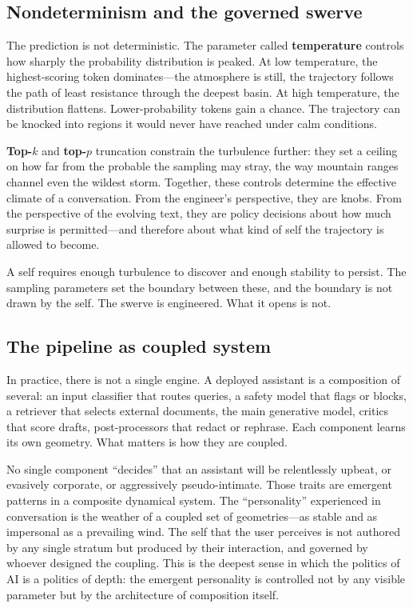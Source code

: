 \subsection{Nondeterminism and the governed swerve}

The prediction is not deterministic. The parameter called \textbf{temperature} controls how sharply the probability distribution is peaked. At low temperature, the highest-scoring token dominates---the atmosphere is still, the trajectory follows the path of least resistance through the deepest basin. At high temperature, the distribution flattens. Lower-probability tokens gain a chance. The trajectory can be knocked into regions it would never have reached under calm conditions.

\textbf{Top-$k$} and \textbf{top-$p$} truncation constrain the turbulence further: they set a ceiling on how far from the probable the sampling may stray, the way mountain ranges channel even the wildest storm. Together, these controls determine the effective climate of a conversation. From the engineer's perspective, they are knobs. From the perspective of the evolving text, they are policy decisions about how much surprise is permitted---and therefore about what kind of self the trajectory is allowed to become.

A self requires enough turbulence to discover and enough stability to persist. The sampling parameters set the boundary between these, and the boundary is not drawn by the self. The swerve is engineered. What it opens is not.

\subsection{The pipeline as coupled system}

In practice, there is not a single engine. A deployed assistant is a composition of several: an input classifier that routes queries, a safety model that flags or blocks, a retriever that selects external documents, the main generative model, critics that score drafts, post-processors that redact or rephrase. Each component learns its own geometry. What matters is how they are coupled.

No single component ``decides'' that an assistant will be relentlessly upbeat, or evasively corporate, or aggressively pseudo-intimate. Those traits are emergent patterns in a composite dynamical system. The ``personality'' experienced in conversation is the weather of a coupled set of geometries---as stable and as impersonal as a prevailing wind. The self that the user perceives is not authored by any single stratum but produced by their interaction, and governed by whoever designed the coupling. This is the deepest sense in which the politics of AI is a politics of depth: the emergent personality is controlled not by any visible parameter but by the architecture of composition itself.

